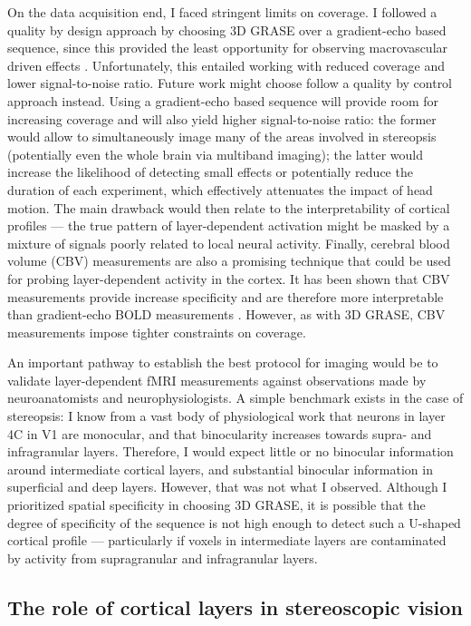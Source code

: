 On the data acquisition end, I faced stringent limits on coverage. I followed a quality by design approach by choosing 3D GRASE over a gradient-echo based sequence, since this provided the least opportunity for observing macrovascular driven effects \cite{DeMartino:2013qy}. Unfortunately, this entailed working with reduced coverage and lower signal-to-noise ratio. Future work might choose follow a quality by control approach instead. Using a gradient-echo based sequence will provide room for increasing coverage and will also yield higher signal-to-noise ratio: the former would allow to simultaneously image many of the areas involved in stereopsis (potentially even the whole brain via multiband imaging); the latter would increase the likelihood of detecting small effects or potentially reduce the duration of each experiment, which effectively attenuates the impact of head motion. The main drawback would then relate to the interpretability of cortical profiles --- the true pattern of layer-dependent activation might be masked by a mixture of signals poorly related to local neural activity. Finally, cerebral blood volume (CBV) measurements are also a promising technique that could be used for probing layer-dependent activity in the cortex. It has been shown that CBV measurements provide increase specificity and are therefore more interpretable than gradient-echo BOLD measurements \cite{Huber:2015ao}. However, as with 3D GRASE, CBV measurements impose tighter constraints on coverage.

An important pathway to establish the best protocol for imaging would be to validate layer-dependent fMRI measurements against observations made by neuroanatomists and neurophysiologists. A simple benchmark exists in the case of stereopsis: I know from a vast body of physiological work that neurons in layer 4C in V1 are monocular, and that binocularity increases towards supra- and infragranular layers. Therefore, I would expect little or no binocular information around intermediate cortical layers, and substantial binocular information in superficial and deep layers. However, that was not what I observed. Although I prioritized spatial specificity in choosing 3D GRASE, it is possible that the degree of specificity of the sequence is not high enough to detect such a U-shaped cortical profile --- particularly if voxels in intermediate layers are contaminated by activity from supragranular and infragranular layers.


\subsection{The role of cortical layers in stereoscopic vision}

